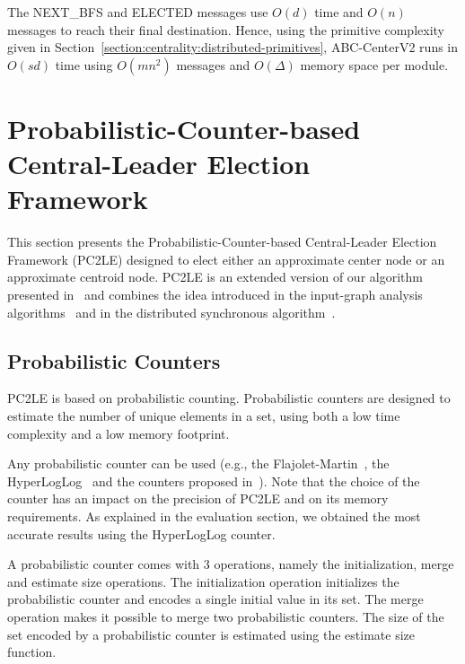 The NEXT\_BFS and ELECTED messages use $O(d)$ time and $O(n)$ messages to reach their final destination. Hence, using the primitive complexity given in Section~\ref{section:centrality:distributed-primitives}, ABC-CenterV2 runs in $O(sd)$ time using $O(mn^2)$ messages and $O(\Delta)$ memory space per module.

\section[Probabilistic-Counter-based Central-Leader Election Framework]{Probabilistic-Counter-based Central-Leader Election Framework%
	}
\label{section:centrality:pc2le}

This section presents the Probabilistic-Counter-based Central-Leader Election Framework (PC2LE) designed to elect either an approximate center node or an approximate centroid node. PC2LE is an extended version of our algorithm presented in~\cite{npgb16b:ip} and combines the idea introduced in the input-graph analysis algorithms~\cite{kang2011centralities,kang2011hadi} and in the distributed synchronous algorithm~\cite{garin2012distributed}.

\subsection{Probabilistic Counters}

PC2LE is based on probabilistic counting. Probabilistic counters are designed to estimate the number of unique elements in a set, using both a low time complexity and a low memory footprint. 

Any probabilistic counter can be used (e.g., the Flajolet-Martin~\cite{flajolet1985probabilistic}, the HyperLogLog~\cite{flajolet2007hyperloglog} and the counters proposed in~\cite{varagnolo2010distributed}). Note that the choice of the counter has an impact on the precision of PC2LE and on its memory requirements. As explained in the evaluation section, we obtained the most accurate results using the HyperLogLog counter.

A probabilistic counter comes with 3 operations, namely the initialization, merge and estimate size operations. The initialization operation initializes the probabilistic counter and encodes a single initial value in its set. The merge operation makes it possible to merge two probabilistic counters. The size of the set encoded by a probabilistic counter is estimated using the estimate size function.

